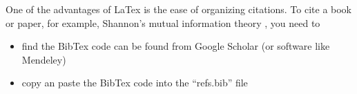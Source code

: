 One of the advantages of LaTex is the ease of organizing citations. To cite a book or paper, for example, Shannon's mutual information theory \cite{shannon1949mathematical}, you need to 
\begin{itemize}
	\item find the BibTex code can be found from Google Scholar (or software like Mendeley)
	\item copy an paste the BibTex code into the ``refs.bib'' file
\end{itemize}
